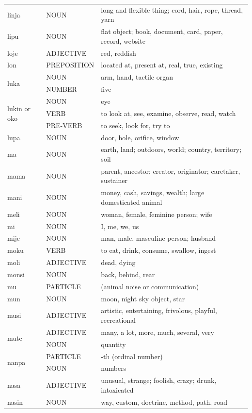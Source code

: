 \documentclass[14pt, a4paper]{extreport}
\begin{document}
\begin{longtable}{llp{10cm}}
  linja & NOUN & long and flexible thing; cord, hair, rope, thread, yarn \\
  lipu & NOUN & flat object; book, document, card, paper, record, website \\
  loje & ADJECTIVE & red, reddish \\
  lon & PREPOSITION & located at, present at, real, true, existing \\
  \multirow[t]{2}{*}{luka} & NOUN & arm, hand, tactile organ \\
  & NUMBER & five \\
  \multirow[t]{3}{*}{lukin or oko} & NOUN & eye \\
  & VERB & to look at, see, examine, observe, read, watch \\
  & PRE-VERB & to seek, look for, try to \\
  lupa & NOUN & door, hole, orifice, window \\
  ma & NOUN & earth, land; outdoors, world; country, territory; soil \\
  mama & NOUN & parent, ancestor; creator, originator; caretaker, sustainer \\
  mani & NOUN & money, cash, savings, wealth; large domesticated animal \\
  meli & NOUN & woman, female, feminine person; wife \\
  mi & NOUN & I, me, we, us \\
  mije & NOUN & man, male, masculine person; husband \\
  moku & VERB & to eat, drink, consume, swallow, ingest \\
  moli & ADJECTIVE & dead, dying \\
  monsi & NOUN & back, behind, rear \\
  mu & PARTICLE & (animal noise or communication) \\
  mun & NOUN & moon, night sky object, star \\
  musi & ADJECTIVE & artistic, entertaining, frivolous, playful, recreational \\
  \multirow[t]{2}{*}{mute} & ADJECTIVE & many, a lot, more, much, several, very \\
  & NOUN & quantity \\
  \multirow[t]{2}{*}{nanpa} & PARTICLE & -th (ordinal number) \\
  & NOUN & numbers \\
  nasa & ADJECTIVE & unusual, strange; foolish, crazy; drunk, intoxicated \\
  nasin & NOUN & way, custom, doctrine, method, path, road \\

\end{longtable}
\end{document}
